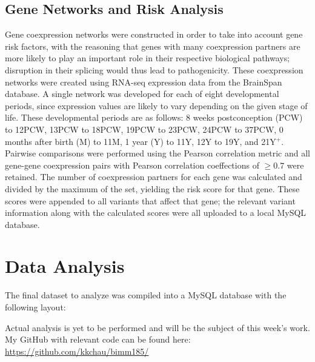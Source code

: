 \documentclass[12pt]{article}
\begin{document}
\subsection{Gene Networks and Risk Analysis}
Gene coexpression networks were constructed in order to take into account
gene risk factors, with the reasoning that genes with many coexpression 
partners are more likely to play an important role in their respective 
biological pathways; disruption in their splicing would thus lead to 
pathogenicity. These coexpression networks were created using RNA-seq 
expression data from the BrainSpan database. A single network was developed for
each of eight developmental periods, since expression values are likely to
vary depending on the given stage of life. These developmental periods are as
follows: 8 weeks postconception (PCW) to 12PCW, 13PCW to 18PCW, 19PCW to 23PCW,
24PCW to 37PCW, 0 months after birth (M) to 11M, 1 year (Y) to 11Y, 12Y to 19Y,
and 21Y$^{+}$. Pairwise comparisons were performed using the Pearson 
correlation metric and all gene-gene coexpression pairs with Pearson
correlation coeffections of $\geq 0.7$ were retained. The number of 
coexpression partners for each gene was calculated and divided by the maximum
of the set, yielding the risk score for that gene. These scores were appended
to all variants that affect that gene; the relevant variant information
along with the calculated scores were all uploaded to a local MySQL database.

\section{Data Analysis}
The final dataset to analyze was compiled into a MySQL database with the 
following layout:



Actual analysis is yet to be performed and will be the subject of this week's 
work.
\\[\baselineskip]
My GitHub with relevant code can be found here: 
\href{https://github.com/kkchau/bimm185/}{https://github.com/kkchau/bimm185/}
\end{document}
